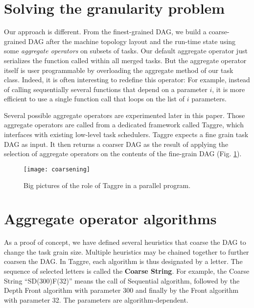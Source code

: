 \section{Solving the granularity problem}

Our approach is different.
%
From the finest-grained DAG, we build a coarse-grained DAG after the machine topology layout and the run-time state using some {\em aggregate operators} on subsets of tasks.
%
Our default aggregate operator just serializes the function called within all merged tasks.
%
But the aggregate operator itself is user programmable by overloading the aggregate method of our task class.
%
Indeed, it is often interesting to redefine this operator: For example, instead of calling sequentially several functions that depend on a parameter $i$, it is more efficient to use a single function call that loops on the list of $i$ parameters.


Several possible aggregate operators are experimented later in this paper.
%
Those aggregate operators are called from a dedicated framework called Taggre, which interfaces with existing low-level task
schedulers.
%
Taggre expects a fine grain task DAG as input.
%
It then returns a coarser DAG as the result of applying the selection of aggregate operators on the contents of the fine-grain DAG (Fig. \ref{fig:taggre}).

\begin{figure}[!ht]
  \centering
  \texttt{[image: coarsening]}
  \caption{Big pictures of the role of Taggre in a parallel program.}
  \label{fig:taggre}
\end{figure}



\section{Aggregate operator algorithms}

As a proof of concept, we have defined several heuristics that
coarse the DAG to change the task grain size.
Multiple heuristics may be
chained together to further coarsen the DAG. In Taggre, each algorithm is
thus designated by a letter. The sequence of selected letters is
called the  {\bf Coarse String}. For example, the Coarse String
``SD(300)F(32)'' means the call of Sequential algorithm, followed
by the Depth Front algorithm with parameter 300 and finally by the
Front algorithm with parameter 32. The parameters are
algorithm-dependent.

